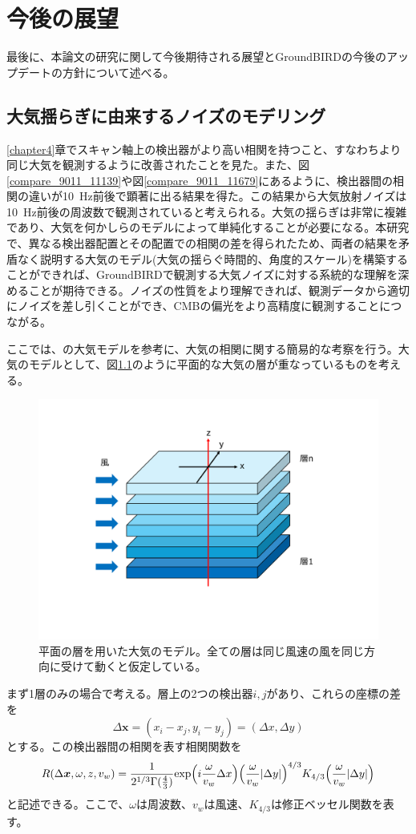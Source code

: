 \chapter{今後の展望}
\label{chapter5}
最後に、本論文の研究に関して今後期待される展望とGroundBIRDの今後のアップデートの方針について述べる。
\section{大気揺らぎに由来するノイズのモデリング}
\label{atmos_model}
\ref{chapter4}章でスキャン軸上の検出器がより高い相関を持つこと、すなわちより同じ大気を観測するように改善されたことを見た。また、図\ref{compare_9011_11139}や図\ref{compare_9011_11679}にあるように、検出器間の相関の違いが\SI{10}{Hz}前後で顕著に出る結果を得た。この結果から大気放射ノイズは\SI{10}{Hz}前後の周波数で観測されていると考えられる。大気の揺らぎは非常に複雑であり、大気を何かしらのモデルによって単純化することが必要になる。本研究で、異なる検出器配置とその配置での相関の差を得られたため、両者の結果を矛盾なく説明する大気のモデル(大気の揺らぐ時間的、角度的スケール)を構築することができれば、GroundBIRDで観測する大気ノイズに対する系統的な理解を深めることが期待できる。ノイズの性質をより理解できれば、観測データから適切にノイズを差し引くことができ、CMBの偏光をより高精度に観測することにつながる。

ここでは、\cite{nishinomiya}の大気モデルを参考に、大気の相関に関する簡易的な考察を行う。大気のモデルとして、図\ref{atmos_layer}のように平面的な大気の層が重なっているものを考える。

\begin{figure}[htbp]
  \centering
  \includegraphics[width=0.7\columnwidth]{6_prospect/figs/atmos_layer.pdf}
  \caption{平面の層を用いた大気のモデル。全ての層は同じ風速の風を同じ方向に受けて動くと仮定している。}
  \label{atmos_layer}
\end{figure}
まず1層のみの場合で考える。層上の2つの検出器$i, j$があり、これらの座標の差を
\begin{equation}
  \Delta\bm{x} = (x_{i} -x_{j}, y_{i} - y_{j}) = (\Delta x, \Delta y)
\end{equation}
とする。この検出器間の相関を表す相関関数を
\begin{equation}
  R(\Delta\bm{x},\omega,z, v_{w}) = \frac{1}{2^{1/3}\Gamma(\frac{4}{3})}\mathrm{exp}\Bigl(i\frac{\omega}{v_{w}}\Delta x\Bigr)\Bigl(\frac{\omega}{v_{w}}|\Delta y|\Bigr)^{4/3}K_{4/3}\Bigl(\frac{\omega}{v_{w}}|\Delta y|\Bigr)
\end{equation}
と記述できる。ここで、$\omega$は周波数、$v_{w}$は風速、$K_{4/3}$は修正ベッセル関数を表す。


